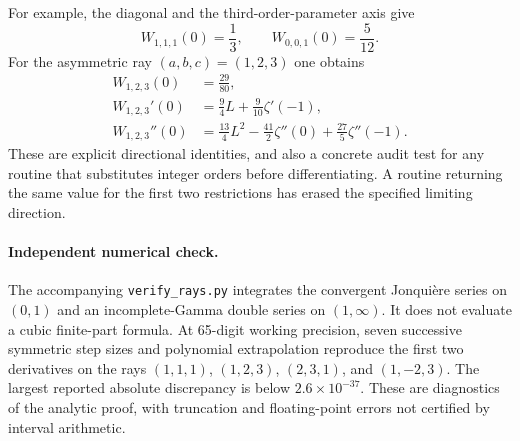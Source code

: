 For example, the diagonal and the third-order-parameter axis give
\[
 W_{1,1,1}(0)=\frac13,\qquad W_{0,0,1}(0)=\frac5{12}.
\]
For the asymmetric ray $(a,b,c)=(1,2,3)$ one obtains
\begin{align*}
 W_{1,2,3}(0)&=\frac{29}{80},\\
 W_{1,2,3}'(0)&=\frac94L+\frac9{10}\zeta'(-1),\\
 W_{1,2,3}''(0)&=\frac{13}{4}L^2-\frac{41}{2}\zeta''(0)
                             +\frac{27}{5}\zeta''(-1).
\end{align*}
These are explicit directional identities, and also a concrete audit
test for any routine that substitutes integer orders before
differentiating.  A routine returning the same value for the first
two restrictions has erased the specified limiting direction.

\paragraph{Independent numerical check.}
The accompanying \texttt{verify\_rays.py} integrates the convergent
Jonqui\`ere series on $(0,1)$ and an incomplete-Gamma double series on
$(1,\infty)$.  It does not evaluate a cubic finite-part formula.
At 65-digit working precision, seven successive symmetric step sizes
and polynomial extrapolation reproduce the first two derivatives on
the rays $(1,1,1)$, $(1,2,3)$, $(2,3,1)$, and $(1,-2,3)$.
The largest reported absolute discrepancy is below $2.6\times10^{-37}$.
These are diagnostics of the analytic proof, with truncation and
floating-point errors not certified by interval arithmetic.
